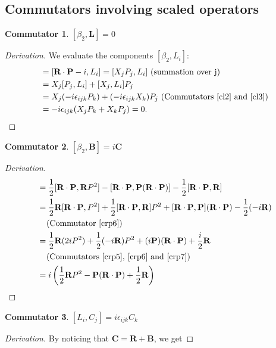 \documentclass[12pt,a4paper]{report}
\theoremstyle{definition}
\newtheorem{commutator}{Commutator}[section]
\newenvironment{derivation}
  {\renewcommand\qedsymbol{$\square$}\begin{proof}[Derivation]}
  {\end{proof}}
\theoremstyle{remark}
\theoremstyle{remark}
\begin{document}
\begin{appendices}
\section{Commutators involving scaled operators}
\begin{commutator}\label{cbeta2.1} $[\beta_2,\textbf{L}]=0$
\end{commutator}
\begin{derivation} We evaluate the components $[\beta_2,L_i]$:
\begin{align*}
[\beta_2,L_i]&=[\textbf{R}\cdot\textbf{P}-i,L_i]=[X_jP_j,L_i]\text{ (summation over j)}\\
&=X_j[P_j,L_i]+[X_j,L_i]P_j\\
&=X_j(-i\epsilon_{ijk}P_k)+(-i\epsilon_{ijk}X_k)P_j \text{ (Commutators~\ref{cl2} and~\ref{cl3})}\\
&=-i\epsilon_{ijk}(X_jP_k+X_kP_j)=0.
\end{align*}
\end{derivation}
\begin{commutator}\label{cbeta2.2} $[\beta_2,\textbf{B}]=i\textbf{C}$
\end{commutator}
\begin{derivation}
\begin{align*}
[\beta_2,\textbf{B}]&=\frac{1}{2}[\textbf{R}\cdot\textbf{P},\textbf{R}P^2]-[\textbf{R}\cdot\textbf{P},\textbf{P}(\textbf{R}\cdot\textbf{P})]-\frac{1}{2}[\textbf{R}\cdot\textbf{P},\textbf{R}] \\
&= \frac{1}{2}\textbf{R}[\textbf{R}\cdot\textbf{P},P^2]+\frac{1}{2}[\textbf{R}\cdot\textbf{P},\textbf{R}]P^2+[\textbf{R}\cdot\textbf{P},\textbf{P}](\textbf{R}\cdot\textbf{P})-\frac{1}{2}(-i\textbf{R}) \\
&\phantom{=}\text{ (Commutator~\ref{crp6})}\\
&=\frac{1}{2}\textbf{R}(2iP^2)+\frac{1}{2}(-i\textbf{R})P^2+(i\textbf{P})(\textbf{R}\cdot\textbf{P})+\frac{i}{2}\textbf{R} \\
&\phantom{=}\text{ (Commutators~\ref{crp5},~\ref{crp6} and~\ref{crp7})}\\
&=i\left(\frac{1}{2}\textbf{R}P^2-\textbf{P}(\textbf{R}\cdot\textbf{P})+\frac{1}{2}\textbf{R}\right)
\end{align*}
\end{derivation}
\begin{commutator}\label{cc1}
$[L_i,C_j]=i\epsilon_{ijk}C_k$
\end{commutator}
\begin{derivation} By noticing that $\textbf{C}=\textbf{R}+\textbf{B}$, we get

\end{derivation}
\end{appendices}
\end{document}
